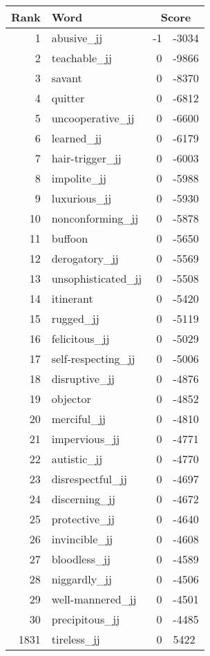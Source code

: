 \begin{longtable}[!htbp]{| rlr@{.}l |}
    \hline
    \textbf{Rank} & \textbf{Word} & \multicolumn{2}{c|}{\textbf{Score}} \\
    \hline
    \endhead
    1 & abusive\_jj & -1 & -3034 \\
    2 & teachable\_jj & 0 & -9866 \\
    3 & savant & 0 & -8370 \\
    4 & quitter & 0 & -6812 \\
    5 & uncooperative\_jj & 0 & -6600 \\
    6 & learned\_jj & 0 & -6179 \\
    7 & hair-trigger\_jj & 0 & -6003 \\
    8 & impolite\_jj & 0 & -5988 \\
    9 & luxurious\_jj & 0 & -5930 \\
    10 & nonconforming\_jj & 0 & -5878 \\
    11 & buffoon & 0 & -5650 \\
    12 & derogatory\_jj & 0 & -5569 \\
    13 & unsophisticated\_jj & 0 & -5508 \\
    14 & itinerant & 0 & -5420 \\
    15 & rugged\_jj & 0 & -5119 \\
    16 & felicitous\_jj & 0 & -5029 \\
    17 & self-respecting\_jj & 0 & -5006 \\
    18 & disruptive\_jj & 0 & -4876 \\
    19 & objector & 0 & -4852 \\
    20 & merciful\_jj & 0 & -4810 \\
    21 & impervious\_jj & 0 & -4771 \\
    22 & autistic\_jj & 0 & -4770 \\
    23 & disrespectful\_jj & 0 & -4697 \\
    24 & discerning\_jj & 0 & -4672 \\
    25 & protective\_jj & 0 & -4640 \\
    26 & invincible\_jj & 0 & -4608 \\
    27 & bloodless\_jj & 0 & -4589 \\
    28 & niggardly\_jj & 0 & -4506 \\
    29 & well-mannered\_jj & 0 & -4501 \\
    30 & precipitous\_jj & 0 & -4485 \\
    1831 & tireless\_jj & 0 & 5422 \\

\end{longtable}
